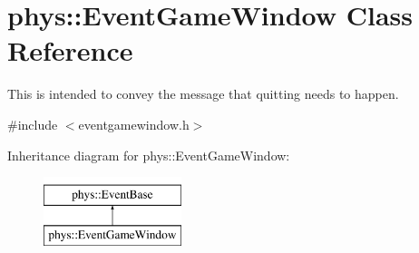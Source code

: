 \hypertarget{classphys_1_1EventGameWindow}{
\section{phys::EventGameWindow Class Reference}
\label{d4/d0f/classphys_1_1EventGameWindow}
}


This is intended to convey the message that quitting needs to happen.  




{\ttfamily \#include $<$eventgamewindow.h$>$}

Inheritance diagram for phys::EventGameWindow:\begin{figure}[H]
\begin{center}
\leavevmode
\includegraphics[height=2.000000cm]{d4/d0f/classphys_1_1EventGameWindow}
\end{center}
\end{figure}
